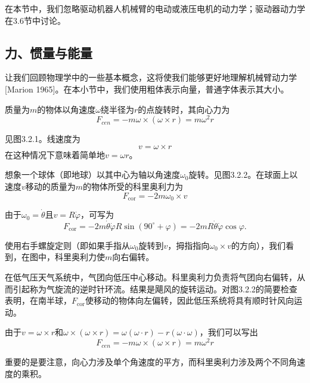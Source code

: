 \documentclass[12pt,a4paper]{ctexart}
\begin{document}
在本节中，我们忽略驱动机器人机械臂的电动或液压电机的动力学；驱动器动力学在3.6节中讨论。

\subsection{力、惯量与能量}

让我们回顾物理学中的一些基本概念，这将使我们能够更好地理解机械臂动力学[Marion 1965]。在本小节中，我们使用粗体表示向量，普通字体表示其大小。

质量为$m$的物体以角速度$\omega$绕半径为$r$的点旋转时，其向心力为
\begin{equation}
F_{cen} = -m\omega \times (\omega \times r) = m\omega^2 r
\end{equation}

见图3.2.1。线速度为
\begin{equation}
v = \omega \times r
\end{equation}
在这种情况下意味着简单地$v = \omega r$。

想象一个球体（即地球）以其中心为轴以角速度$\omega_0$旋转。见图3.2.2。在球面上以速度$v$移动的质量为$m$的物体所受的科里奥利力为
\begin{equation}
F_{\text{cor}} = -2m\omega_0 \times v
\end{equation}

由于$\omega_0 = \dot{\theta}$且$v = R\dot{\varphi}$，可写为
\begin{equation}\label{eq:3.2.4}
F_{\text{cor}} = -2m\dot{\theta}\dot{\varphi}R\sin(90^\circ + \varphi) = -2mR\dot{\theta}\dot{\varphi}\cos\varphi.
\end{equation}

使用右手螺旋定则（即如果手指从$\omega_0$旋转到$v$，拇指指向$\omega_0 \times v$的方向），我们看到，在图中，科里奥利力使$m$向右偏转。

在低气压天气系统中，气团向低压中心移动。科里奥利力负责将气团向右偏转，从而引起称为气旋流的逆时针环流。结果是飓风的旋转运动。对图3.2.2的简要检查表明，在南半球，$F_{\text{cor}}$使移动的物体向左偏转，因此低压系统将具有顺时针风向运动。

由于$v = \omega \times r$和$\omega \times (\omega \times r) = \omega(\omega \cdot r) - r(\omega \cdot \omega)$，我们可以写出
\begin{equation}
F_{cen} = -m\omega \times (\omega \times r) = m\omega^2 r
\end{equation}

重要的是要注意，向心力涉及单个角速度的平方，而科里奥利力涉及两个不同角速度的乘积。
\end{document}
